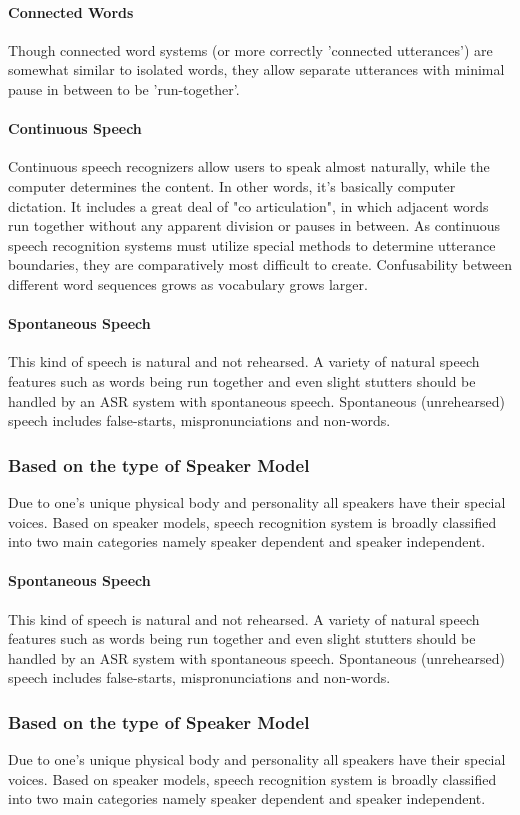 \documentclass[a4paper,12pt]{report} %
\begin{document}
 \paragraph{Connected Words}
        Though connected word systems (or more correctly 'connected utterances') are somewhat similar to isolated words, they allow separate utterances with minimal pause in between to be 'run-together'.
\paragraph{Continuous Speech}
Continuous speech recognizers allow users to speak almost naturally, while the computer determines the content. In other words, it's basically computer dictation. It includes a great deal of "co articulation", in which adjacent words run together without any apparent division or pauses in between. As continuous speech recognition systems must utilize special methods to determine utterance boundaries, they are comparatively most difficult to create. Confusability between different word sequences grows as vocabulary grows larger.
\paragraph{Spontaneous Speech}
This kind of speech is natural and not rehearsed. A variety of natural speech features such as words being run together and even slight stutters should be handled by an ASR system with spontaneous speech. Spontaneous (unrehearsed) speech includes false-starts, mispronunciations and non-words.
\subsubsection{Based on the type of Speaker Model}
        Due to one’s unique physical body and personality all speakers have their special voices. Based on speaker models, speech recognition system is broadly classified into two main categories namely speaker dependent and speaker independent.
 \paragraph{Spontaneous Speech}
           This kind of speech is natural and not rehearsed. A variety of natural speech features such as words being run together and even slight stutters should be handled by an ASR system with spontaneous speech. Spontaneous (unrehearsed) speech includes false-starts, mispronunciations and non-words.
\subsubsection{Based on the type of Speaker Model}
        Due to one’s unique physical body and personality all speakers have their special voices. Based on speaker models, speech recognition system is broadly classified into two main categories namely speaker dependent and speaker independent.
\end{document}
